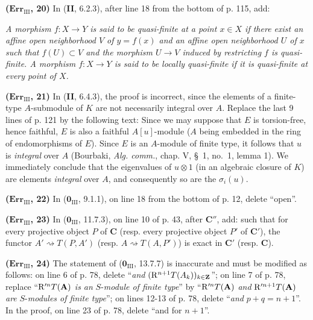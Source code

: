 \noindent\textbf{($\mathbf{Err}_{\mathrm{III}}$, 20)} In (\textbf{II}, 6.2.3), after
line 18 from the bottom of p. 115, add:

\emph{A morphism $f:X\to Y$ is said to be quasi-finite at a point $x\in X$ if
there exist an affine open neighborhood $V$ of $y=f(x)$ and an affine open
neighborhood $U$ of $x$ such that $f(U)\subset V$ and the morphism $U\to V$
induced by restricting $f$ is quasi-finite. A morphism $f:X\to Y$ is said to
be locally quasi-finite if it is quasi-finite at every point of $X$.}

\noindent\textbf{($\mathbf{Err}_{\mathrm{III}}$, 21)} In (\textbf{II}, 6.4.3), the
proof is incorrect, since the elements of a finite-type $A$-submodule of $K$
are not necessarily integral over $A$. Replace the last 9 lines of p. 121 by
the following text: Since we may suppose that $E$ is torsion-free, hence
faithful, $E$ is also a faithful $A[u]$-module ($A$ being embedded in the
ring of endomorphisms of $E$). Since $E$ is an $A$-module of finite type, it
follows that $u$ is \emph{integral} over $A$ (Bourbaki, \emph{Alg. comm.},
chap. V, \S~1, no.~1, lemma 1). We immediately conclude that the eigenvalues
of $u\otimes1$ (in an algebraic closure of $K$) are elements \emph{integral}
over $A$, and consequently so are the $\sigma_i(u)$.

\noindent\textbf{($\mathbf{Err}_{\mathrm{III}}$, 22)} In
($\mathbf{0}_{\mathrm{III}}$, 9.1.1), on line 18 from the bottom of p. 12, delete
``open''.

\noindent\textbf{($\mathbf{Err}_{\mathrm{III}}$, 23)} In
($\mathbf{0}_{\mathrm{III}}$, 11.7.3), on line 10 of p. 43, after $\boldsymbol{C}''$, add:
such that for every projective object $P$ of $\boldsymbol{C}$ (resp. every
projective object $P'$ of $\boldsymbol{C}'$), the functor
$A'\rightsquigarrow T(P,A')$ (resp. $A\rightsquigarrow T(A,P')$) is exact in
$\boldsymbol{C}'$ (resp. $\boldsymbol{C}$).

\noindent\textbf{($\mathbf{Err}_{\mathrm{III}}$, 24)} The statement of
($\mathbf{0}_{\mathrm{III}}$, 13.7.7) is inaccurate and must be modified as follows:
on line 6 of p. 78, delete ``\emph{and}
$(\mathrm{R}^{n+1}T(A_k))_{k\in\mathbf Z}$''; on line 7 of p. 78, replace
``$\mathrm{R}'^nT(\mathbf A)$ \emph{is an} $S$-\emph{module of finite type}'' by ``$\mathrm{R}'^nT(\mathbf A)$ \emph{and}
$\mathrm{R}'^{n+1}T(\mathbf A)$ \emph{are} $S$-\emph{modules of finite type}''; on lines 12-13 of p. 78,
delete ``\emph{and} $p+q=n+1$''. In the proof, on line 23 of p. 78, delete ``and for
$n+1$''.


